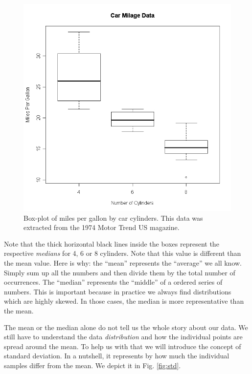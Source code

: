 \begin{figure}[h]
	\begin{center}
			\includegraphics[scale=0.3]{Parts/basics/milleagech2}
	\end{center}
	\caption{Box-plot of miles per gallon by car cylinders. This data was extracted from the 1974 Motor Trend US magazine.}
	\label{fig:boxplot}
\end{figure} 

Note that the thick horizontal black lines inside the boxes represent the respective \textit{medians} for 4, 6 or 8 cylinders. Note that this value is different than the mean value. Here is why: the ``mean'' represents the ``average'' we all know. Simply sum up all the numbers and then divide them by the total number of occurrences. The ``median'' represents the ``middle'' of a ordered series of numbers. This is important because in practice we always find distributions which are highly skewed. In those cases, the median is more representative than the mean.

The mean or the median alone do not tell us the whole story about our data. We still have to understand the data \textit{distribution} and how the individual points are spread around the mean. To help us with that we will introduce the concept of standard deviation. In a nutshell, it represents by how much the individual samples differ from the mean. We depict it in Fig. \ref{fig:std}.

